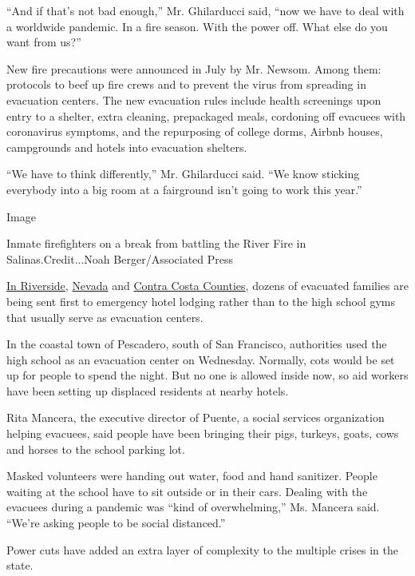 ``And if that's not bad enough,'' Mr. Ghilarducci said, ``now we have to
deal with a worldwide pandemic. In a fire season. With the power off.
What else do you want from us?''

New fire precautions were announced in July by Mr. Newsom. Among them:
protocols to beef up fire crews and to prevent the virus from spreading
in evacuation centers. The new evacuation rules include health
screenings upon entry to a shelter, extra cleaning, prepackaged meals,
cordoning off evacuees with coronavirus symptoms, and the repurposing of
college dorms, Airbnb houses, campgrounds and hotels into evacuation
shelters.

``We have to think differently,'' Mr. Ghilarducci said. ``We know
sticking everybody into a big room at a fairground isn't going to work
this year.''

Image

Inmate firefighters on a break from battling the River Fire in
Salinas.Credit...Noah Berger/Associated Press

\href{https://www.latimes.com/california/story/2020-08-05/la-me-apple-fire-evacuations-coronavirus}{In
Riverside},
\href{https://www.theunion.com/news/nevada-county-evacuations-continue-as-firefighters-battle-jones-fire/}{Nevada}
and
\href{https://www.sfchronicle.com/california-wildfires/article/Alameda-County-vegetation-fire-prompts-evacuation-15488467.php}{Contra
Costa Counties}, dozens of evacuated families are being sent first to
emergency hotel lodging rather than to the high school gyms that usually
serve as evacuation centers.

In the coastal town of Pescadero, south of San Francisco, authorities
used the high school as an evacuation center on Wednesday. Normally,
cots would be set up for people to spend the night. But no one is
allowed inside now, so aid workers have been setting up displaced
residents at nearby hotels.

Rita Mancera, the executive director of Puente, a social services
organization helping evacuees, said people have been bringing their
pigs, turkeys, goats, cows and horses to the school parking lot.

Masked volunteers were handing out water, food and hand sanitizer.
People waiting at the school have to sit outside or in their cars.
Dealing with the evacuees during a pandemic was ``kind of
overwhelming,'' Ms. Mancera said. ``We're asking people to be social
distanced.''

Power cuts have added an extra layer of complexity to the multiple
crises in the state.

